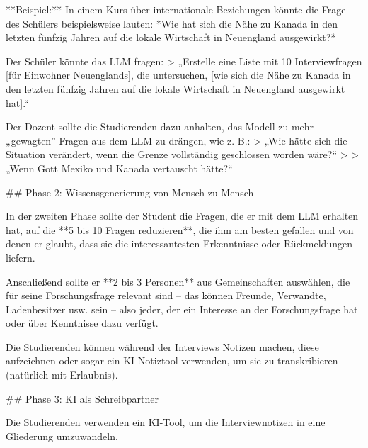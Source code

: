 \documentclass[
  ngerman,
  letterpaper,
  DIV=11]{scrreprt}
\newenvironment{Shaded}{\begin{snugshade}}{\end{snugshade}}
\newcommand{\AttributeTok}[1]{\textcolor[rgb]{0.40,0.45,0.13}{#1}}
\newcommand{\CommentTok}[1]{\textcolor[rgb]{0.37,0.37,0.37}{#1}}
\newcommand{\FunctionTok}[1]{\textcolor[rgb]{0.28,0.35,0.67}{#1}}
\newcommand{\NormalTok}[1]{\textcolor[rgb]{0.00,0.23,0.31}{#1}}
\newcommand{\OtherTok}[1]{\textcolor[rgb]{0.00,0.23,0.31}{#1}}
\begin{document}
\begin{tcolorbox}
\begin{Shaded}
\begin{Highlighting}[]
\NormalTok{**Beispiel:**}
\NormalTok{In einem Kurs über internationale Beziehungen könnte die Frage des Schülers beispielsweise lauten: *Wie hat sich die Nähe zu Kanada in den letzten fünfzig Jahren auf die lokale Wirtschaft in Neuengland ausgewirkt?*}

\NormalTok{Der Schüler könnte das LLM fragen:}
\AttributeTok{\textgreater{} „Erstelle eine Liste mit 10 Interviewfragen }\CommentTok{[}\OtherTok{für Einwohner Neuenglands}\CommentTok{]}\AttributeTok{, die untersuchen, }\CommentTok{[}\OtherTok{wie sich die Nähe zu Kanada in den letzten fünfzig Jahren auf die lokale Wirtschaft in Neuengland ausgewirkt hat}\CommentTok{]}\AttributeTok{.“}

\NormalTok{Der Dozent sollte die Studierenden dazu anhalten, das Modell zu mehr „gewagten” Fragen aus dem LLM zu drängen, wie z. B.:}
\AttributeTok{\textgreater{} „Wie hätte sich die Situation verändert, wenn die Grenze vollständig geschlossen worden wäre?“}
\AttributeTok{\textgreater{}}
\AttributeTok{\textgreater{} „Wenn Gott Mexiko und Kanada vertauscht hätte?“}

\FunctionTok{\#\# Phase 2: Wissensgenerierung von Mensch zu Mensch}

\NormalTok{In der zweiten Phase sollte der Student die Fragen, die er mit dem LLM erhalten hat, auf die **5 bis 10 Fragen reduzieren**, die ihm am besten gefallen und von denen er glaubt, dass sie die interessantesten Erkenntnisse oder Rückmeldungen liefern.}

\NormalTok{Anschließend sollte er **2 bis 3 Personen** aus Gemeinschaften auswählen, die für seine Forschungsfrage relevant sind – das können Freunde, Verwandte, Ladenbesitzer usw. sein – also jeder, der ein Interesse an der Forschungsfrage hat oder über Kenntnisse dazu verfügt.}

\NormalTok{Die Studierenden können während der Interviews Notizen machen, diese aufzeichnen oder sogar ein KI{-}Notiztool verwenden, um sie zu transkribieren (natürlich mit Erlaubnis).}

\FunctionTok{\#\# Phase 3: KI als Schreibpartner}

\NormalTok{Die Studierenden verwenden ein KI{-}Tool, um die Interviewnotizen in eine Gliederung umzuwandeln.}


\end{Highlighting}
\end{Shaded}
\end{tcolorbox}
\end{document}
